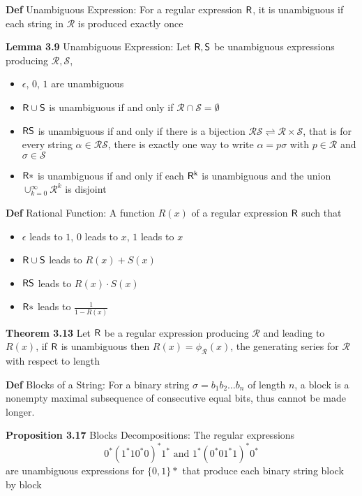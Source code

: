 \documentclass[11pt,notitlepage]{report}
\newcommand{\mc}[1]{\ensuremath{\mathcal{#1}}}
\newcommand{\tbf}[1]{\textbf{#1}}
\begin{document}
\tbf{Def} Unambiguous Expression: For a regular expression $\sf R$, it is unambiguous if each string in $\mc R$ is produced exactly once

\tbf{Lemma 3.9} Unambiguous Expression: Let $\sf R, \sf S$ be unambiguous expressions producing $\mc R, \mc S$,
\vspace{-4mm}
\begin{itemize}
    \item $\epsilon$, $0$, $1$ are unambiguous
    \item $\sf R \cup \sf S$ is unambiguous if and only if $\mc R \cap \mc S = \emptyset$
    \item $\sf R \sf S$ is unambiguous if and only if there is a bijection $\mc R \mc S \rightleftharpoons \mc R \times \mc S$, that is for every string $\alpha \in \mc R \mc S$, there is exactly one way to write $\alpha = p\sigma$ with $p \in \mc R$ and $\sigma \in \mc S$
    \item $\sf R*$ is unambiguous if and only if each $\sf R^k$ is unambiguous and the union $\cup_{k=0}^\infty \mc R^k$ is disjoint
\end{itemize}

\tbf{Def} Rational Function: A function $R(x)$ of a regular expression $\sf R$ such that
\vspace{-4mm}
\begin{itemize}
    \item $\epsilon$ leads to $1$, $0$ leads to $x$, $1$ leads to $x$
    \item $\sf R \cup \sf S$ leads to $R(x) + S(x)$
    \item $\sf R \sf S$ leads to $R(x) \cdot S(x)$
    \item $\sf R*$ leads to $\frac{1}{1-R(x)}$
\end{itemize}

\tbf{Theorem 3.13} Let $\sf R$ be a regular expression producing $\mc R$ and leading to $R(x)$, if $\sf R$ is unambiguous then $R(x) = \phi_{\mc R}(x)$, the generating series for $\mc R$ with respect to length

\tbf{Def} Blocks of a String: For a binary string $\sigma = b_1b_2\dots b_n$ of length $n$, a block is a nonempty maximal subsequence of consecutive equal bits, thus cannot be made longer.

\tbf{Proposition 3.17} Blocks Decompositions: The regular expressions
$$0^*(1^*10^*0)^*1^* \text{ and } 1^*(0^*01^*1)^*0^*$$
are unambiguous expressions for $\{0, 1\}*$ that produce each binary string block by block
\end{document}
